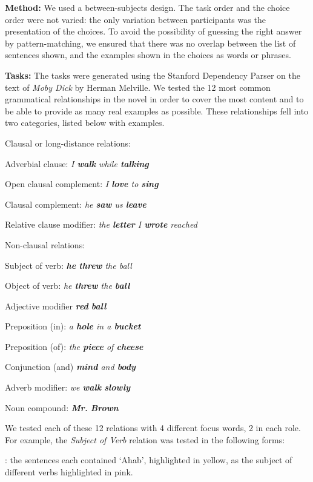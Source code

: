 {\bf Method:} We used a between-subjects design. The task order and the choice order were not varied: the only variation between participants was the presentation of the choices. To avoid the possibility of  guessing the right answer by pattern-matching, we ensured that there was no overlap between the list of sentences shown, and the examples shown in the choices as words or phrases.

{\bf Tasks:} The tasks were generated using the Stanford Dependency Parser \cite{de2006generating} on the text of \emph{Moby Dick} by Herman Melville. We tested the 12 most common grammatical relationships in the novel in order to cover the most content and to be able to provide as many real examples as possible. These relationships fell into two categories, listed below with examples.

Clausal or long-distance relations:
\squishlist
	\item Adverbial clause: \emph{ I \textbf{walk} while \textbf{talking}}
	\item Open clausal complement:  \emph{I \textbf{love} to \textbf{sing} }
	\item  Clausal complement:  \emph{ he \textbf{saw} us \textbf{leave}}
	\item  Relative clause modifier:  \emph{the \textbf{letter} I \textbf{wrote} reached }
\squishend

Non-clausal relations:
\squishlist
	\item Subject of verb: \emph{\textbf{he} \textbf{threw} the ball}
	\item Object of verb:  \emph{ he \textbf{threw} the \textbf{ball}}
	\item Adjective modifier \emph{\textbf{red} \textbf{ball}}
	\item Preposition (in): \emph{a \textbf{hole} in a \textbf{bucket}}
	\item Preposition (of):  \emph{ the \textbf{piece} of \textbf{cheese}}
	\item Conjunction (and)  \emph{ \textbf{mind} and \textbf{body}}
	\item Adverb modifier: \emph{  we \textbf{walk} \textbf{slowly}}
	\item Noun compound:  \emph{ \textbf{Mr.}  \textbf{Brown}}
\squishend

We tested each of these 12 relations with 4 different focus words, 2 in each role. For example, the \emph{Subject of Verb} relation  was tested in the following forms:
\squishlist
	\item {}:  the sentences each contained `Ahab', highlighted in yellow, as the subject of different verbs highlighted in pink.
	\item {}

